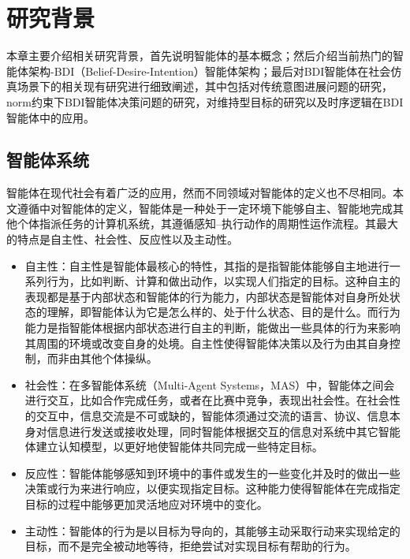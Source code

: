 \chapter{研究背景}\label{background}
本章主要介绍相关研究背景，首先说明智能体的基本概念；然后介绍当前热门的智能体架构-BDI（Belief-Desire-Intention）智能体架构；最后对BDI智能体在社会仿真场景下的相关现有研究进行细致阐述，其中包括对传统意图进展问题的研究，norm约束下BDI智能体决策问题的研究，对维持型目标的研究以及时序逻辑在BDI智能体中的应用。
\section{智能体系统}
智能体在现代社会有着广泛的应用，然而不同领域对智能体的定义也不尽相同。本文遵循\cite{DBLP:journals/ker/WooldridgeJ95}中对智能体的定义，智能体是一种处于一定环境下能够自主、智能地完成其他个体指派任务的计算机系统，其遵循感知--执行动作的周期性运作流程。其最大的特点是自主性、社会性、反应性以及主动性。
\begin{itemize}
  \item 自主性：自主性是智能体最核心的特性，其指的是指智能体能够自主地进行一系列行为，比如判断、计算和做出动作，以实现人们指定的目标。这种自主的表现都是基于内部状态和智能体的行为能力，内部状态是智能体对自身所处状态的理解，即智能体认为它是怎么样的、处于什么状态、目的是什么。而行为能力是指智能体根据内部状态进行自主的判断，能做出一些具体的行为来影响其周围的环境或改变自身的处境。自主性使得智能体决策以及行为由其自身控制，而非由其他个体操纵。
  \item 社会性：在多智能体系统（Multi-Agent Systems，MAS）中，智能体之间会进行交互，比如合作完成任务，或者在比赛中竞争，表现出社会性。在社会性的交互中，信息交流是不可或缺的，智能体须通过交流的语言、协议、信息本身对信息进行发送或接收处理，同时智能体根据交互的信息对系统中其它智能体建立认知模型，以更好地使智能体共同完成一些特定目标。
   \item 反应性：智能体能够感知到环境中的事件或发生的一些变化并及时的做出一些决策或行为来进行响应，以便实现指定目标。这种能力使得智能体在完成指定目标的过程中能够更加灵活地应对环境中的变化。
   \item 主动性：智能体的行为是以目标为导向的，其能够主动采取行动来实现给定的目标，而不是完全被动地等待，拒绝尝试对实现目标有帮助的行为。
\end{itemize}
